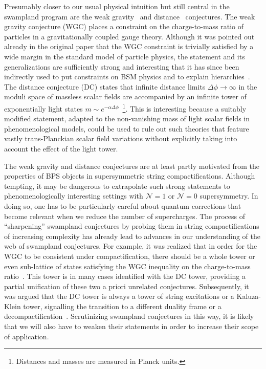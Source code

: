 \documentclass[11pt,a4paper]{article}
\numberwithin{equation}{section}
\numberwithin{table}{section}\setlength{\multlinegap}{25pt}
\begin{document}
Presumably closer to our usual physical intuition but still central in the swampland program are the weak gravity~\cite{Arkani-Hamed:2006emk} and distance~\cite{Ooguri:2006in} conjectures. The weak gravity conjecture (WGC) places a constraint on the charge-to-mass ratio of particles in a gravitationally coupled gauge theory. Although it was pointed out already in the original paper that the WGC constraint is trivially satisfied by a wide margin in the standard model of particle physics, the statement and its generalizations are sufficiently strong and interesting that it has since been indirectly used to put constraints on BSM physics and to explain hierarchies~\cite{Ibanez:2017kvh,Ibanez:2017oqr,Gonzalo:2018tpb,Hamada:2017yji,Reece:2018zvv,Montero:2019ekk,Montero:2021otb}. The distance conjecture (DC) states that infinite distance limits $\Delta\phi\to\infty$ in the moduli space of massless scalar fields are accompanied by an infinite tower of exponentially light states $m\sim e^{-\alpha\Delta\phi}$~\footnote{Distances and masses are measured in Planck units.}. This is interesting because a suitably modified statement, adapted to the non-vanishing mass of light scalar fields in phenomenological models, could be used to rule out such theories that feature vastly trans-Planckian scalar field variations without explicitly taking into account the effect of the light tower.

The weak gravity and distance conjectures are at least partly motivated from the properties of BPS objects in supersymmetric string compactifications. Although tempting, it may be dangerous to extrapolate such strong statements to phenomenologically interesting settings with $\mathcal{N}=1$ or $\mathcal{N}=0$ supersymmetry. In doing so, one has to be particularly careful about quantum corrections that become relevant when we reduce the number of supercharges. The process of ``sharpening'' swampland conjectures by probing them in string compactifications of increasing complexity has already lead to advances in our understanding of the web of swampland conjectures. For example, it was realized that in order for the WGC to be consistent under compactification, there should be a whole tower or even sub-lattice of states satisfying the WGC inequality on the charge-to-mass ratio~\cite{Heidenreich:2015nta,Heidenreich:2016aqi,Andriolo:2018lvp}. This tower is in many cases identified with the DC tower, providing a partial unification of these two a priori unrelated conjectures. Subsequently, it was argued that the DC tower is always a tower of string excitations or a Kaluza-Klein tower, signalling the transition to a different duality frame or a decompactification~\cite{Lee:2018urn,Lee:2018spm,Lee:2019tst,Lee:2019xtm,Lee:2019wij,Klaewer:2020lfg}. Scrutinizing swampland conjectures in this way, it is likely that we will also have to weaken their statements in order to increase their scope of application. 
\end{document}
